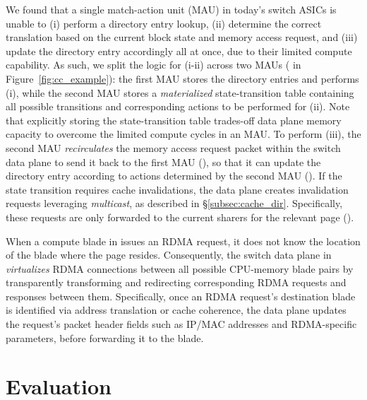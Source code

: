  We found that a single match-action unit (MAU) in today's switch ASICs is unable to (i) perform a directory entry lookup, (ii) determine the correct translation based on the current block state and memory access request, and (iii) update the directory entry accordingly all at once, due to their limited compute capability. As such, we split the logic for (i-ii) across two MAUs ( in Figure~\ref{fig:cc_example}): the first MAU stores the directory entries and performs (i), while the second MAU stores a \textit{materialized} state-transition table containing all possible transitions and corresponding actions to be performed for (ii). Note that explicitly storing the state-transition table trades-off data plane memory capacity to overcome the limited compute cycles in an MAU. To perform (iii), the second MAU \textit{recirculates} the memory access request packet within the switch data plane to send it back to the first MAU (), so that it can update the directory entry according to actions determined by the second MAU (). If the state transition requires cache invalidations, the data plane creates invalidation requests leveraging \textit{multicast}, as described in \S\ref{subsec:cache_dir}. Specifically, these requests are only forwarded to the current sharers for the relevant page ().

 When a compute blade in \mind issues an RDMA request, it does not know the location of the blade where the page resides. Consequently, the switch data plane in \mind \textit{virtualizes} RDMA connections between all possible CPU-memory blade pairs by transparently transforming and redirecting corresponding RDMA requests and responses between them. Specifically, once an RDMA request's destination blade is identified via address translation or cache coherence, the data plane updates the request's packet header fields such as IP/MAC addresses and RDMA-specific parameters, before forwarding it to the blade.

%
\section{Evaluation}
\label{sec:mindevaluation}

